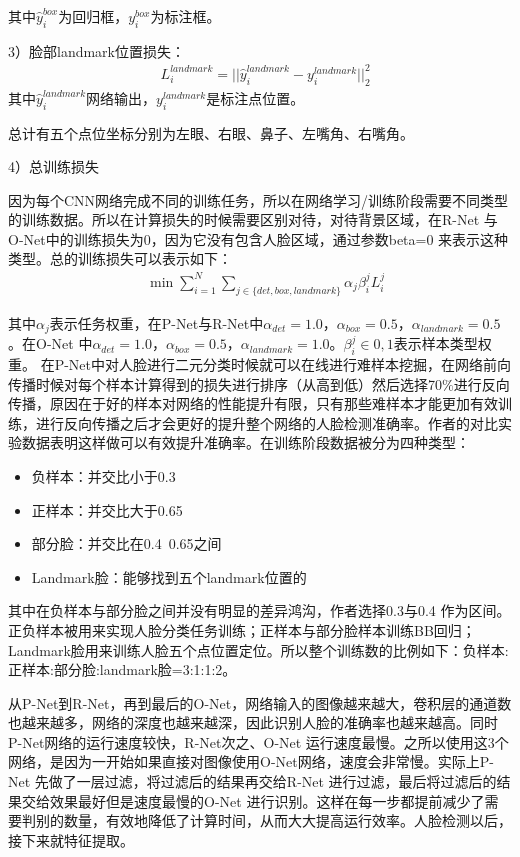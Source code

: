 其中$\hat{y}_i^{box}$为回归框，${y}_i^{box}$为标注框。

3）脸部landmark位置损失：
\begin{align}
& L_i^{landmark} = ||\hat{y}_i^{landmark} - y_i^{landmark}||_2^2
\end{align}
其中$\hat{y}_i^{landmark}$网络输出，$y_i^{landmark}$是标注点位置。

总计有五个点位坐标分别为左眼、右眼、鼻子、左嘴角、右嘴角。

4）总训练损失

因为每个CNN网络完成不同的训练任务，所以在网络学习/训练阶段需要不同类型的训练数据。所以在计算损失的时候需要区别对待，对待背景区域，在R-Net 与O-Net中的训练损失为0，因为它没有包含人脸区域，通过参数beta=0 来表示这种类型。总的训练损失可以表示如下：
\begin{align}
& \min \sum_{i = 1}^N \sum_{j \in \{det,box,landmark\}} \alpha_j \beta_i^j L_i^j
\end{align}

其中$\alpha_j$表示任务权重，在P-Net与R-Net中$\alpha_{det} = 1.0$，$\alpha_{box} = 0.5$，$\alpha_{landmark} = 0.5$。在O-Net 中$\alpha_{det} = 1.0$，$\alpha_{box} = 0.5$，$\alpha_{landmark} = 1.0$。$\beta_i^j \in {0,1}$表示样本类型权重。
在P-Net中对人脸进行二元分类时候就可以在线进行难样本挖掘，在网络前向传播时候对每个样本计算得到的损失进行排序（从高到低）然后选择70$\%$进行反向传播，原因在于好的样本对网络的性能提升有限，只有那些难样本才能更加有效训练，进行反向传播之后才会更好的提升整个网络的人脸检测准确率。作者的对比实验数据表明这样做可以有效提升准确率。在训练阶段数据被分为四种类型：
\begin{itemize}
    \item 负样本：并交比小于0.3
    \item 正样本：并交比大于0.65
    \item 部分脸：并交比在0.4~0.65之间
    \item Landmark脸：能够找到五个landmark位置的
\end{itemize}

其中在负样本与部分脸之间并没有明显的差异鸿沟，作者选择0.3与0.4 作为区间。正负样本被用来实现人脸分类任务训练；正样本与部分脸样本训练BB回归；Landmark脸用来训练人脸五个点位置定位。所以整个训练数的比例如下：负样本:正样本:部分脸:landmark脸=3:1:1:2。

从P-Net到R-Net，再到最后的O-Net，网络输入的图像越来越大，卷积层的通道数也越来越多，网络的深度也越来越深，因此识别人脸的准确率也越来越高。同时P-Net网络的运行速度较快，R-Net次之、O-Net 运行速度最慢。之所以使用这3个网络，是因为一开始如果直接对图像使用O-Net网络，速度会非常慢。实际上P-Net 先做了一层过滤，将过滤后的结果再交给R-Net 进行过滤，最后将过滤后的结果交给效果最好但是速度最慢的O-Net 进行识别。这样在每一步都提前减少了需要判别的数量，有效地降低了计算时间，从而大大提高运行效率。人脸检测以后，接下来就特征提取。

